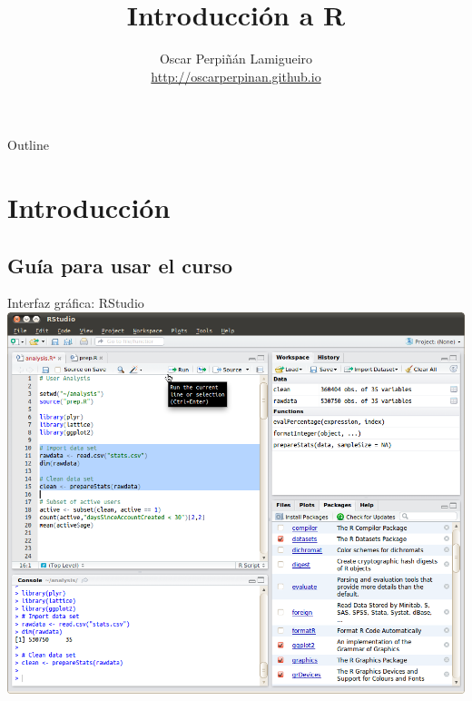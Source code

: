 \documentclass[xcolor={usenames,svgnames,dvipsnames}]{beamer}
\author{Oscar Perpiñán Lamigueiro \\ \url{http://oscarperpinan.github.io}}
\date{}
\title{Introducción a R}
\begin{document}
\maketitle
\begin{frame}{Outline}
\tableofcontents
\end{frame}


\section{Introducción}
\label{sec-1}


\subsection{Guía para usar el curso}
\label{sec-1-1}

\begin{frame}[plain,label=sec-1-1-1]{Interfaz gráfica: RStudio}
\includegraphics[width=1.05\textwidth]{figs/rstudio-ubuntu.png}
\end{frame}
\end{document}
